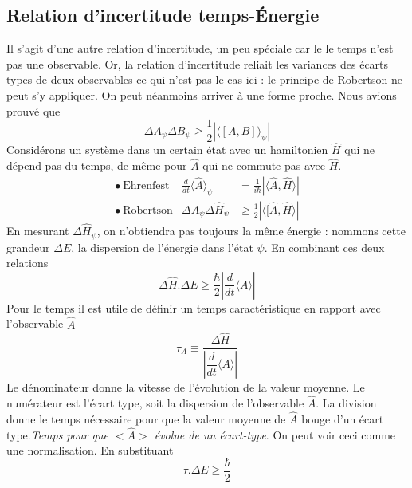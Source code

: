 \subsection{Relation d'incertitude temps-Énergie}
Il s'agit d'une autre relation d'incertitude, un peu spéciale car le le temps n'est pas une observable. Or, 
la relation d'incertitude reliait les variances des écarts types de deux observables ce qui n'est pas le cas ici : le principe de Robertson ne peut s'y appliquer. On peut néanmoins arriver à une forme proche. Nous avions prouvé que
\begin{equation}
\Delta A_\psi \Delta B_\psi \geq \frac{1}{2}\left|\langle [A,B]\rangle_\psi\right|
\end{equation}
Considérons un système dans un certain état avec un hamiltonien $\hat H$ qui ne dépend pas du 
temps, de même pour $\hat A$ qui ne commute pas avec $\hat{H}$. 
\begin{equation}
\begin{array}{lll}
\bullet\ \text{Ehrenfest} & \frac{d}{dt}\langle \hat{A}\rangle_\psi &= \frac{1}{i\hbar}|\langle\hat{A},\hat{H}
\rangle|\\
\bullet\ \text{Robertson} & \Delta A_\psi\Delta\hat{H}_\psi &\geq \frac{1}{2}|\langle [\hat{A},\hat{H} \rangle|
\end{array}
\end{equation}
En mesurant $\Delta\hat{H}_\psi$, on n'obtiendra pas toujours la même énergie : nommons cette grandeur $\Delta E$, 
la dispersion de l'énergie dans l'état $\psi$. En combinant ces deux relations
\begin{equation}
\Delta\hat{H}.\Delta E \geq \dfrac{\hbar}{2}\left|\dfrac{d}{dt}\langle A\rangle \right|
\end{equation}
Pour le temps il est utile de définir un temps caractéristique en rapport avec l'observable 
$\hat{A}$
\begin{equation}
\tau_A \equiv \dfrac{\Delta\hat{H}}{\left|\dfrac{d}{dt}\langle A\rangle \right|}
\end{equation}
Le dénominateur donne la vitesse de l'évolution de la valeur moyenne. Le numérateur est l'écart
type, soit la dispersion de l'observable $\hat A$. La division donne le temps nécessaire pour que la 
valeur moyenne de $\hat A$ bouge d'un écart type.\textit{Temps pour que $<\hat A>$ évolue de un écart-type}. 
On peut voir ceci comme une normalisation. En substituant
\begin{equation}
\tau.\Delta E \geq \dfrac{\hbar}{2}
\end{equation}
